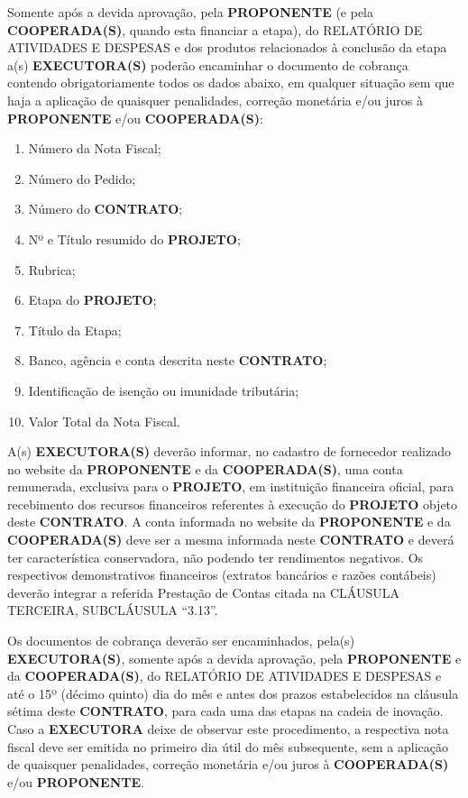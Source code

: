 \xx Somente após a devida aprovação, pela \textbf{PROPONENTE} (e pela \textbf{COOPERADA(S)}, quando esta financiar a etapa), do RELATÓRIO DE ATIVIDADES E DESPESAS e dos produtos relacionados à conclusão da etapa a(s) \textbf{EXECUTORA(S)} poderão encaminhar o documento de cobrança contendo obrigatoriamente todos os dados abaixo, em qualquer situação sem que haja a aplicação de quaisquer penalidades, correção monetária e/ou juros à \textbf{PROPONENTE} e/ou \textbf{COOPERADA(S)}:

\begin{enumerate}[label=\alph*), leftmargin=2cm]
    \item Número da Nota Fiscal;
    \item Número do Pedido;
    \item Número do \textbf{CONTRATO};
    \item Nº e Título resumido do \textbf{PROJETO};
    \item Rubrica;
    \item Etapa do \textbf{PROJETO};
    \item Título da Etapa;
    \item Banco, agência e conta descrita neste \textbf{CONTRATO};
    \item Identificação de isenção ou imunidade tributária;
    \item Valor Total da Nota Fiscal.
\end{enumerate}

\xx A(s) \textbf{EXECUTORA(S)} deverão informar, no cadastro de fornecedor realizado no website da \textbf{PROPONENTE} e da \textbf{COOPERADA(S)}, uma conta remunerada, exclusiva para o \textbf{PROJETO}, em instituição financeira oficial, para recebimento dos recursos financeiros referentes à execução do \textbf{PROJETO} objeto deste \textbf{CONTRATO}. A conta informada no website da \textbf{PROPONENTE} e da \textbf{COOPERADA(S)} deve ser a mesma informada neste \textbf{CONTRATO} e deverá ter característica conservadora, não podendo ter rendimentos negativos. Os respectivos demonstrativos financeiros (extratos bancários e razões contábeis) deverão integrar a referida Prestação de Contas citada na CLÁUSULA TERCEIRA, SUBCLÁUSULA “3.13”.

\xx Os documentos de cobrança deverão ser encaminhados, pela(s) \textbf{EXECUTORA(S)}, somente após a devida aprovação, pela \textbf{PROPONENTE} e da \textbf{COOPERADA(S)}, do RELATÓRIO DE ATIVIDADES E DESPESAS e até o 15º (décimo quinto) dia do mês e antes dos prazos estabelecidos na cláusula sétima deste \textbf{CONTRATO}, para cada uma das etapas na cadeia de inovação. Caso a \textbf{EXECUTORA} deixe de observar este procedimento, a respectiva nota fiscal deve ser emitida no primeiro dia útil do mês subsequente, sem a aplicação de quaisquer penalidades, correção monetária e/ou juros à \textbf{COOPERADA(S)} e/ou \textbf{PROPONENTE}.

